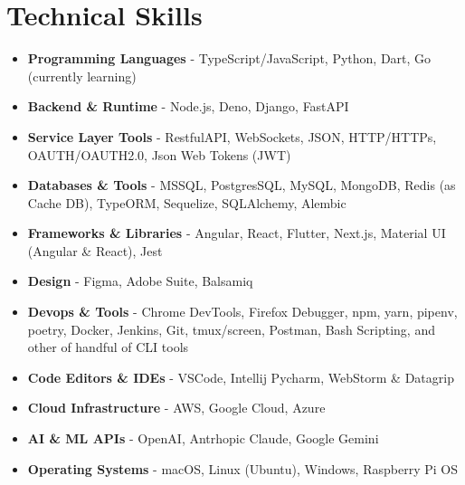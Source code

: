 \section{Technical Skills}
{
	\normalsize
	\begin{itemize}[topsep=0pt, partopsep=0pt, itemsep=0pt, parsep=0pt]
		\item \textbf{Programming Languages} - TypeScript/JavaScript, Python, Dart, Go (currently learning)
		\item \textbf{Backend \& Runtime} - Node.js, Deno, Django, FastAPI
		\item \textbf{Service Layer Tools} - RestfulAPI, WebSockets, JSON, HTTP/HTTPs, OAUTH/OAUTH2.0, Json Web Tokens (JWT)
		\item \textbf{Databases \& Tools} - MSSQL, PostgresSQL, MySQL, MongoDB, Redis (as Cache DB), TypeORM, Sequelize, SQLAlchemy, Alembic
		\item \textbf{Frameworks \& Libraries} - Angular, React, Flutter, Next.js, Material UI (Angular \& React), Jest
		\item \textbf{Design} - Figma, Adobe Suite, Balsamiq
		\item \textbf{Devops \& Tools} - Chrome DevTools, Firefox Debugger, npm, yarn, pipenv, poetry, Docker, Jenkins, Git, tmux/screen, Postman, Bash Scripting, and other of handful of CLI tools
		\item \textbf{Code Editors \& IDEs} - VSCode, Intellij Pycharm, WebStorm \& Datagrip
		\item \textbf{Cloud Infrastructure} - AWS, Google Cloud, Azure
		\item \textbf{AI \& ML APIs} - OpenAI, Antrhopic Claude, Google Gemini
		\item \textbf{Operating Systems} - macOS, Linux (Ubuntu), Windows, Raspberry Pi OS
	\end{itemize}
}